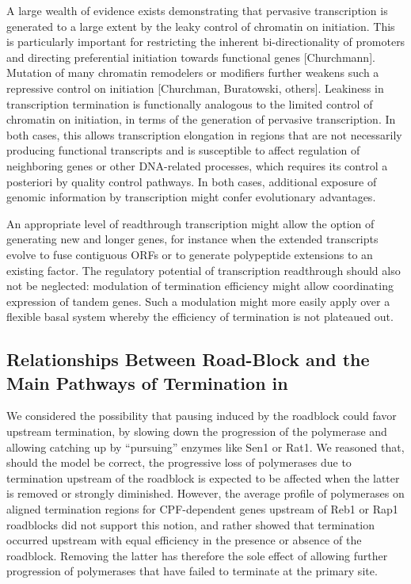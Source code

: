 A large wealth of evidence exists demonstrating that pervasive transcription is generated to a large extent by the leaky control of chromatin on initiation. This is particularly important for restricting the inherent bi-directionality of promoters and directing preferential initiation towards functional genes [Churchmann]. Mutation of many chromatin remodelers or modifiers further weakens such a repressive control on initiation [Churchman, Buratowski, others]. Leakiness in transcription termination is functionally analogous to the limited control of chromatin on initiation, in terms of the generation of pervasive transcription. In both cases, this allows transcription elongation in regions that are not necessarily producing functional transcripts and is susceptible to affect regulation of neighboring genes or other DNA-related processes, which requires its control a posteriori by quality control pathways. In both cases, additional exposure of genomic information by transcription might confer evolutionary advantages.  

An appropriate level of readthrough transcription might allow the option of generating new and longer genes, for instance when the extended transcripts evolve to fuse contiguous ORFs or to generate polypeptide extensions to an existing factor. The regulatory potential of transcription readthrough should also not be neglected: modulation of termination efficiency might allow coordinating expression of tandem genes. Such a modulation might more easily apply over a flexible basal system whereby the efficiency of termination is not plateaued out.


\singlespacing
\subsection*{Relationships Between Road-Block and the Main Pathways of Termination in \cer{}}
\doublespacing


We considered the possibility that pausing induced by the roadblock could favor upstream termination, by slowing down the progression of the polymerase and allowing catching up by “pursuing” enzymes like Sen1 or Rat1.  We reasoned that, should the model be correct, the progressive loss of polymerases due to termination upstream of the roadblock is expected to be affected when the latter is removed or strongly diminished. However, the average profile of polymerases on aligned termination regions for CPF-dependent genes upstream of Reb1 or Rap1 roadblocks did not support this notion, and rather showed that termination occurred upstream with equal efficiency in the presence or absence of the roadblock. Removing the latter has therefore the sole effect of allowing further progression of polymerases that have failed to terminate at the primary site. 

